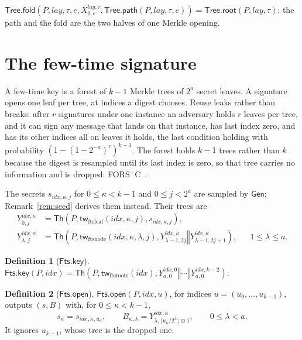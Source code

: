 \documentclass[11pt]{article}
\theoremstyle{definition}
\newtheorem{definition}{Definition}[section]
\theoremstyle{plain}
\theoremstyle{remark}
\newcommand{\Th}{\mathsf{Th}}
\newcommand{\Gen}{\mathsf{Gen}}
\newcommand{\concat}{\mathbin\Vert}
\newcommand{\idx}{\mathit{idx}}
\newcommand{\lay}{\mathit{lay}}
\newcommand{\TreeRoot}{\mathsf{Tree.root}}
\newcommand{\TreePath}{\mathsf{Tree.path}}
\newcommand{\TreeFold}{\mathsf{Tree.fold}}
\newcommand{\FtsKey}{\mathsf{Fts.key}}
\newcommand{\FtsOpen}{\mathsf{Fts.open}}
\begin{document}
$\TreeFold(P,\lay,\tau,e,X^{\lay,\tau}_{0,e},\TreePath(P,\lay,\tau,e))=\TreeRoot(P,\lay,\tau)$: the path and the fold are the two halves of one Merkle opening.

\section{The few-time signature}
\label{sec:fts}

A few-time key is a forest of $k-1$ Merkle trees of $2^a$ secret leaves. A signature opens one leaf per tree, at indices a digest chooses. Reuse leaks rather than breaks: after $r$ signatures under one instance an adversary holds $r$ leaves per tree, and it can sign any message that lands on that instance, has last index zero, and has its other indices all on leaves it holds, the last condition holding with probability $\left(1-(1-2^{-a})^{r}\right)^{k-1}$. The forest holds $k-1$ trees rather than $k$ because the digest is resampled until its last index is zero, so that tree carries no information and is dropped: FORS$^+$C~\cite{HK22C}.

The secrets $s_{\idx,\kappa,j}$ for $0\leq\kappa<k-1$ and $0\leq j<2^a$ are sampled by $\Gen$; Remark~\ref{rem:seed} derives them instead. Their trees are
\[
\begin{aligned}
  Y^{\idx,\kappa}_{0,j} &= \Th\!\left(P,\mathsf{tw}_{\mathrm{ftsleaf}}(\idx,\kappa,j),s_{\idx,\kappa,j}\right),\\
  Y^{\idx,\kappa}_{\lambda,j} &= \Th\!\left(P,\mathsf{tw}_{\mathrm{ftsnode}}(\idx,\kappa,\lambda,j),Y^{\idx,\kappa}_{\lambda-1,2j}\concat Y^{\idx,\kappa}_{\lambda-1,2j+1}\right), &&1\leq\lambda\leq a.
\end{aligned}
\]

\begin{definition}[$\FtsKey$]
$\FtsKey(P,\idx)=\Th\!\left(P,\mathsf{tw}_{\mathrm{ftsroots}}(\idx),Y^{\idx,0}_{a,0}\concat\cdots\concat Y^{\idx,k-2}_{a,0}\right)$.
\end{definition}

\begin{definition}[$\FtsOpen$]
$\FtsOpen(P,\idx,u)$, for indices $u=(u_0,\ldots,u_{k-1})$, outputs $(s,B)$ with, for $0\leq\kappa<k-1$,
\[
  s_\kappa=s_{\idx,\kappa,u_\kappa},
  \qquad
  B_{\kappa,\lambda}=Y^{\idx,\kappa}_{\lambda,\lfloor u_\kappa/2^\lambda\rfloor\oplus1},\qquad 0\leq\lambda<a.
\]
It ignores $u_{k-1}$, whose tree is the dropped one.
\end{definition}
\end{document}
